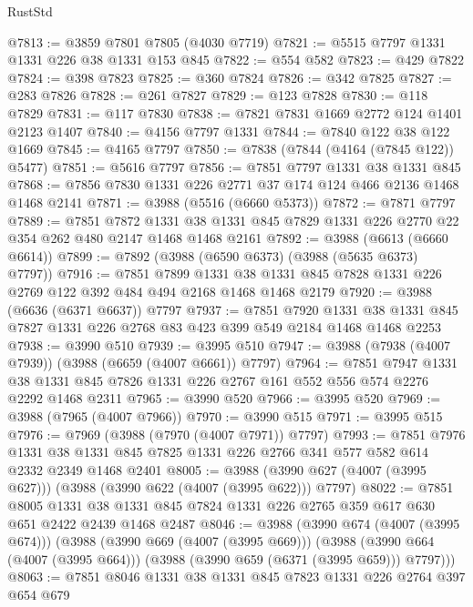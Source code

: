 \begin{lexlean}{RustStd}
\begin{coremodule}
@7813 := @3859 @7801 @7805 (@4030 @7719)
@7821 := @5515 @7797 @1331 @1331 @226 @38 @1331 @153 @845
@7822 := @554 @582
@7823 := @429 @7822
@7824 := @398 @7823
@7825 := @360 @7824
@7826 := @342 @7825
@7827 := @283 @7826
@7828 := @261 @7827
@7829 := @123 @7828
@7830 := @118 @7829
@7831 := @117 @7830
@7838 := @7821 @7831 @1669 @2772 @124 @1401 @2123 @1407
@7840 := @4156 @7797 @1331
@7844 := @7840 @122 @38 @122 @1669
@7845 := @4165 @7797
@7850 := @7838 (@7844 (@4164 (@7845 @122)) @5477)
@7851 := @5616 @7797
@7856 := @7851 @7797 @1331 @38 @1331 @845
@7868 := @7856 @7830 @1331 @226 @2771 @37 @174 @124 @466 @2136 @1468 @1468 @2141
@7871 := @3988 (@5516 (@6660 @5373))
@7872 := @7871 @7797
@7889 := @7851
    @7872
    @1331
    @38
    @1331
    @845
    @7829
    @1331
    @226
    @2770
    @22
    @354
    @262
    @480
    @2147
    @1468
    @1468
    @2161
@7892 := @3988 (@6613 (@6660 @6614))
@7899 := @7892 (@3988 (@6590 @6373) (@3988 (@5635 @6373) @7797))
@7916 := @7851
    @7899
    @1331
    @38
    @1331
    @845
    @7828
    @1331
    @226
    @2769
    @122
    @392
    @484
    @494
    @2168
    @1468
    @1468
    @2179
@7920 := @3988 (@6636 (@6371 @6637)) @7797
@7937 := @7851
    @7920
    @1331
    @38
    @1331
    @845
    @7827
    @1331
    @226
    @2768
    @83
    @423
    @399
    @549
    @2184
    @1468
    @1468
    @2253
@7938 := @3990 @510
@7939 := @3995 @510
@7947 := @3988 (@7938 (@4007 @7939)) (@3988 (@6659 (@4007 @6661)) @7797)
@7964 := @7851
    @7947
    @1331
    @38
    @1331
    @845
    @7826
    @1331
    @226
    @2767
    @161
    @552
    @556
    @574
    @2276
    @2292
    @1468
    @2311
@7965 := @3990 @520
@7966 := @3995 @520
@7969 := @3988 (@7965 (@4007 @7966))
@7970 := @3990 @515
@7971 := @3995 @515
@7976 := @7969 (@3988 (@7970 (@4007 @7971)) @7797)
@7993 := @7851
    @7976
    @1331
    @38
    @1331
    @845
    @7825
    @1331
    @226
    @2766
    @341
    @577
    @582
    @614
    @2332
    @2349
    @1468
    @2401
@8005 := @3988 (@3990 @627 (@4007 (@3995 @627))) (@3988 (@3990 @622 (@4007 (@3995 @622))) @7797)
@8022 := @7851
    @8005
    @1331
    @38
    @1331
    @845
    @7824
    @1331
    @226
    @2765
    @359
    @617
    @630
    @651
    @2422
    @2439
    @1468
    @2487
@8046 := @3988
    (@3990 @674 (@4007 (@3995 @674)))
    (@3988
      (@3990 @669 (@4007 (@3995 @669)))
      (@3988 (@3990 @664 (@4007 (@3995 @664))) (@3988 (@3990 @659 (@6371 (@3995 @659))) @7797)))
@8063 := @7851
    @8046
    @1331
    @38
    @1331
    @845
    @7823
    @1331
    @226
    @2764
    @397
    @654
    @679

\end{coremodule}
\end{lexlean}

